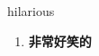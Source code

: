 
\begin{frame}
{\huge hilarious}
\begin{center}
\begin{enumerate}\Large
  \item \textbf{非常好笑的}
\end{enumerate}
\end{center}
\end{frame}
